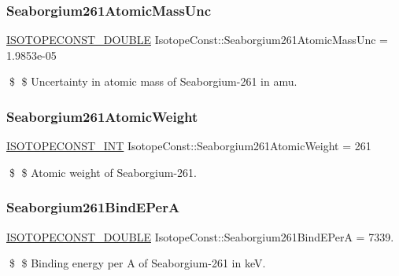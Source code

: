\subsubsection{\texorpdfstring{Seaborgium261\+Atomic\+Mass\+Unc}{Seaborgium261AtomicMassUnc}}
{\footnotesize\ttfamily \mbox{\hyperlink{group___isotope_const-_macros_ga8f45a7272ce02c0b4c65c44636ed719a}{I\+S\+O\+T\+O\+P\+E\+C\+O\+N\+S\+T\+\_\+\+D\+O\+U\+B\+LE}} Isotope\+Const\+::\+Seaborgium261\+Atomic\+Mass\+Unc = 1.\+9853e-\/05}

\$ \$ Uncertainty in atomic mass of Seaborgium-\/261 in amu. \mbox{\label{group___isotope_const-_seaborgium-_sg261_gae0dc6fd6728ffd4a883349b1c1b53c80}} 
\subsubsection{\texorpdfstring{Seaborgium261\+Atomic\+Weight}{Seaborgium261AtomicWeight}}
{\footnotesize\ttfamily \mbox{\hyperlink{group___isotope_const-_macros_ga5f18360b3e99483a35c32d789e62621c}{I\+S\+O\+T\+O\+P\+E\+C\+O\+N\+S\+T\+\_\+\+I\+NT}} Isotope\+Const\+::\+Seaborgium261\+Atomic\+Weight = 261}

\$ \$ Atomic weight of Seaborgium-\/261. \mbox{\label{group___isotope_const-_seaborgium-_sg261_ga927c033c88f9924dbae184370fe2d882}} 
\subsubsection{\texorpdfstring{Seaborgium261\+Bind\+E\+PerA}{Seaborgium261BindEPerA}}
{\footnotesize\ttfamily \mbox{\hyperlink{group___isotope_const-_macros_ga8f45a7272ce02c0b4c65c44636ed719a}{I\+S\+O\+T\+O\+P\+E\+C\+O\+N\+S\+T\+\_\+\+D\+O\+U\+B\+LE}} Isotope\+Const\+::\+Seaborgium261\+Bind\+E\+PerA = 7339.}

\$ \$ Binding energy per A of Seaborgium-\/261 in keV. \mbox{\label{group___isotope_const-_seaborgium-_sg261_gacaa54f7eddaf4496b84c468c81219df4}} 

